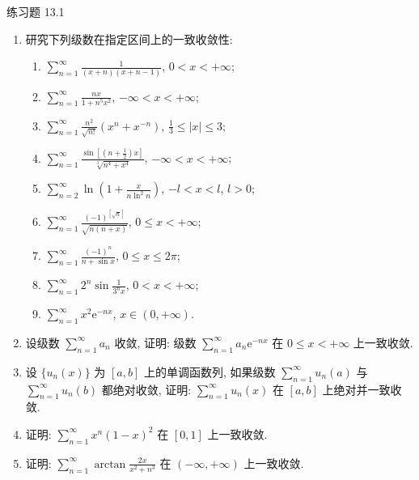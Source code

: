 \begin{exblock}{练习题 13.1}
\begin{enumerate}
  \item 研究下列级数在指定区间上的一致收敛性:
  \begin{enumerate}
    \item $\displaystyle\sum_{n=1}^{\infty}\frac{1}{(x+n)(x+n-1)}$, $0<x<+\infty$;
    \item $\displaystyle\sum_{n=1}^{\infty}\frac{nx}{1+n^{5}x^{2}}$, $-\infty<x<+\infty$;
    \item $\displaystyle\sum_{n=1}^{\infty}\frac{n^{2}}{\sqrt{n!}}(x^{n}+x^{-n})$, $\frac{1}{3}\leqslant|x|\leqslant3$;
    \item $\displaystyle\sum_{n=1}^{\infty}\frac{\sin\left[\left(n+\frac{1}{2}\right)x\right]}{\sqrt[3]{n^{4}+x^{4}}}$, $-\infty<x<+\infty$;
    \item $\displaystyle\sum_{n=2}^{\infty}\ln\left(1+\frac{x}{n\ln^{2}n}\right)$, $-l<x<l$, $l>0$;
    \item $\displaystyle\sum_{n=1}^{\infty}\frac{(-1)^{[\sqrt{n}]}}{\sqrt{n(n+x)}}$, $0\leqslant x<+\infty$;
    \item $\displaystyle\sum_{n=1}^{\infty}\frac{(-1)^{n}}{n+\sin x}$, $0\leqslant x\leqslant2\pi$;
    \item $\displaystyle\sum_{n=1}^{\infty}2^{n}\sin\frac{1}{3^{n}x}$, $0<x<+\infty$;
    \item $\displaystyle\sum_{n=1}^{\infty}x^{2}\mathrm{e}^{-nx}$, $x\in(0,+\infty)$.
  \end{enumerate}
  \item 设级数 $\sum_{n=1}^{\infty}a_{n}$ 收敛, 证明: 级数 $\sum_{n=1}^{\infty}a_{n}\mathrm{e}^{-nx}$ 在 $0\leqslant x<+\infty$ 上一致收敛.
  \item 设 $\{u_{n}(x)\}$ 为 $[a,b]$ 上的单调函数列, 如果级数 $\sum_{n=1}^{\infty}u_{n}(a)$ 与 $\sum_{n=1}^{\infty}u_{n}(b)$ 都绝对收敛, 证明: $\sum_{n=1}^{\infty}u_{n}(x)$ 在 $[a,b]$ 上绝对并一致收敛.
  \item 证明: $\sum_{n=1}^{\infty}x^{n}(1-x)^{2}$ 在 $[0,1]$ 上一致收敛.
  \item 证明: $\sum_{n=1}^{\infty}\arctan\frac{2x}{x^{2}+n^{3}}$ 在 $(-\infty,+\infty)$ 上一致收敛.
\end{enumerate}
\end{exblock}

